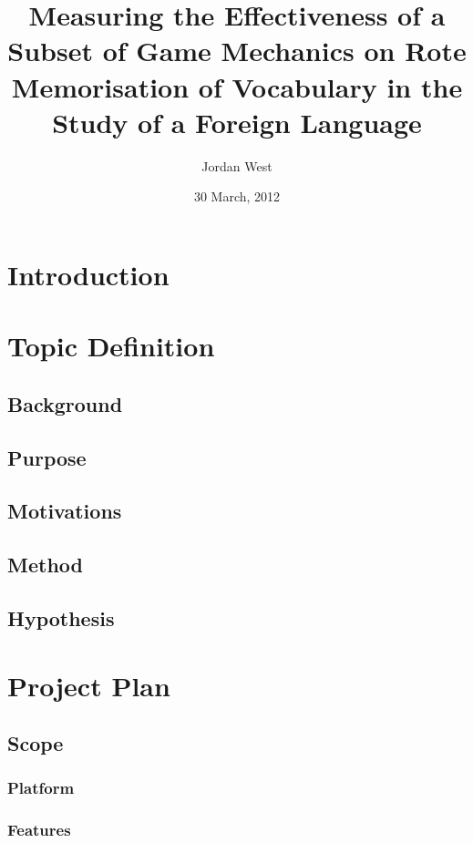 \documentclass[a4paper]{article}
\title{Measuring the Effectiveness of a Subset of Game Mechanics on Rote Memorisation of Vocabulary in the Study of a Foreign Language}
\date{30 March, 2012}
\author{Jordan West}
\begin{document}


\tableofcontents
\newpage

\section{Introduction}


\section{Topic Definition}
\subsection{Background} \label{background}

\subsection{Purpose}

\subsection{Motivations}

\subsection{Method}

\subsection{Hypothesis}


\section{Project Plan}
\subsection{Scope}
\subsubsection{Platform}

\subsubsection{Features}

\end{document}
